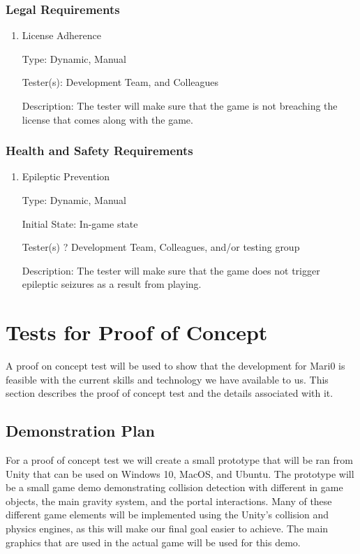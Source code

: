 \documentclass[12pt, titlepage]{article}
\begin{document}
\subsubsection{Legal Requirements}

\begin{enumerate}

\item{License Adherence\\}

Type: Dynamic, Manual

Tester(s): Development Team, and Colleagues

Description: The tester will make sure that the game is not breaching the license that comes along with the game.

\end{enumerate}

\subsubsection{Health and Safety Requirements}

\begin{enumerate}

\item{Epileptic Prevention\\}

Type: Dynamic, Manual

Initial State: In-game state

Tester(s) ? Development Team, Colleagues, and/or testing group

Description: The tester will make sure that the game does not trigger epileptic seizures as a result from playing.

\end{enumerate}

\section{Tests for Proof of Concept}

A proof on concept test will be used to show that the development for Mari0 is feasible with the current skills and technology we have available to us. This section describes the proof of concept test and the details associated with it.

\subsection{Demonstration Plan}
For a proof of concept test we will create a small prototype that will be ran from Unity that can be used on Windows 10, MacOS, and Ubuntu. The prototype will be a small game demo demonstrating collision detection with different in game objects, the main gravity system, and the portal interactions. Many of these different game elements will be implemented using the Unity's collision and physics engines, as this will make our final goal easier to achieve. The main  graphics that are used in the actual game will be used for this demo.
\end{document}
